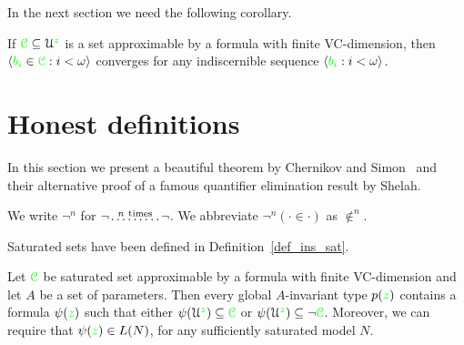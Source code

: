 In the next section we need the following corollary.

\begin{corollary}\label{corol_altrank}
If ${\color{green}\EuScript C}\subseteq\EuScript U^{\color{green} z}$ is a set approximable by a formula with finite VC-dimension, then $\langle{\color{green}b_i}\in{\color{green}\EuScript C}:i<\omega\rangle$ converges for any indiscernible sequence $\langle{\color{green}b_i}:i<\omega\rangle$.
\end{corollary}



  




\section{Honest definitions}
\label{honest}

In this section we present a beautiful theorem by Chernikov and Simon~\cite{CS} and their alternative proof of a famous quantifier elimination result by Shelah. 

We write \emph{$\neg^n$\/} for $\neg\!\stackrel{n\ \rm times}{\dots\dots\dots}\!\neg$.
We abbreviate $\neg^n(\cdot\in\cdot)$ as \emph{$\notin^n$}.

Saturated sets have been defined in Definition~\ref{def_ins_sat}. 

\begin{lemma}\label{lem_honest}
Let ${\color{green}\EuScript C}$ be saturated set approximable by a formula with finite VC-dimension and let $A$ be a set of parameters.
Then every global $A$-invariant type $p({\color{green} z})$ contains a formula $\psi({\color{green} z})$ such that either $\psi(\EuScript U^{\color{green} z})\subseteq{\color{green}\EuScript C}$ or $\psi(\EuScript U^{\color{green} z})\subseteq\neg{\color{green}\EuScript C}$.
Moreover, we can require that $\psi({\color{green} z})\in L(N)$, for any sufficiently saturated model $N$.
\end{lemma}


